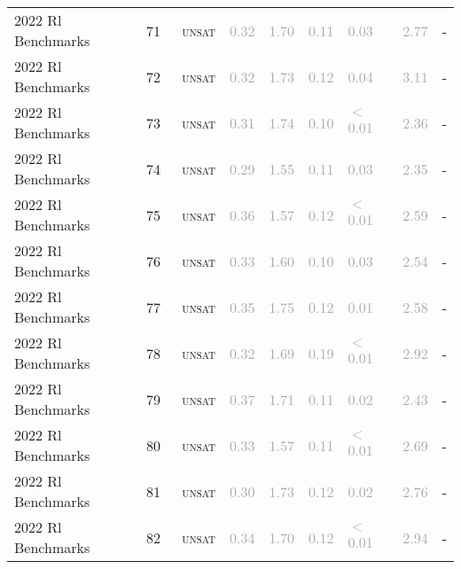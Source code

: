 \begin{center}
{\begin{longtable}{@{}lllllllll@{}}
2022 Rl Benchmarks & 71 & ~\textsc{unsat} & \textcolor{darkgray}{0.32} & \textcolor{darkgray}{1.70} & \textcolor{darkgray}{0.11} & \textcolor{darkgray}{0.03} & \textcolor{darkgray}{2.77} & - \\
2022 Rl Benchmarks & 72 & ~\textsc{unsat} & \textcolor{darkgray}{0.32} & \textcolor{darkgray}{1.73} & \textcolor{darkgray}{0.12} & \textcolor{darkgray}{0.04} & \textcolor{darkgray}{3.11} & - \\
2022 Rl Benchmarks & 73 & ~\textsc{unsat} & \textcolor{darkgray}{0.31} & \textcolor{darkgray}{1.74} & \textcolor{darkgray}{0.10} & \textcolor{darkgray}{$<$0.01} & \textcolor{darkgray}{2.36} & - \\
2022 Rl Benchmarks & 74 & ~\textsc{unsat} & \textcolor{darkgray}{0.29} & \textcolor{darkgray}{1.55} & \textcolor{darkgray}{0.11} & \textcolor{darkgray}{0.03} & \textcolor{darkgray}{2.35} & - \\
2022 Rl Benchmarks & 75 & ~\textsc{unsat} & \textcolor{darkgray}{0.36} & \textcolor{darkgray}{1.57} & \textcolor{darkgray}{0.12} & \textcolor{darkgray}{$<$0.01} & \textcolor{darkgray}{2.59} & - \\
2022 Rl Benchmarks & 76 & ~\textsc{unsat} & \textcolor{darkgray}{0.33} & \textcolor{darkgray}{1.60} & \textcolor{darkgray}{0.10} & \textcolor{darkgray}{0.03} & \textcolor{darkgray}{2.54} & - \\
2022 Rl Benchmarks & 77 & ~\textsc{unsat} & \textcolor{darkgray}{0.35} & \textcolor{darkgray}{1.75} & \textcolor{darkgray}{0.12} & \textcolor{darkgray}{0.01} & \textcolor{darkgray}{2.58} & - \\
2022 Rl Benchmarks & 78 & ~\textsc{unsat} & \textcolor{darkgray}{0.32} & \textcolor{darkgray}{1.69} & \textcolor{darkgray}{0.19} & \textcolor{darkgray}{$<$0.01} & \textcolor{darkgray}{2.92} & - \\
2022 Rl Benchmarks & 79 & ~\textsc{unsat} & \textcolor{darkgray}{0.37} & \textcolor{darkgray}{1.71} & \textcolor{darkgray}{0.11} & \textcolor{darkgray}{0.02} & \textcolor{darkgray}{2.43} & - \\
2022 Rl Benchmarks & 80 & ~\textsc{unsat} & \textcolor{darkgray}{0.33} & \textcolor{darkgray}{1.57} & \textcolor{darkgray}{0.11} & \textcolor{darkgray}{$<$0.01} & \textcolor{darkgray}{2.69} & - \\
2022 Rl Benchmarks & 81 & ~\textsc{unsat} & \textcolor{darkgray}{0.30} & \textcolor{darkgray}{1.73} & \textcolor{darkgray}{0.12} & \textcolor{darkgray}{0.02} & \textcolor{darkgray}{2.76} & - \\
2022 Rl Benchmarks & 82 & ~\textsc{unsat} & \textcolor{darkgray}{0.34} & \textcolor{darkgray}{1.70} & \textcolor{darkgray}{0.12} & \textcolor{darkgray}{$<$0.01} & \textcolor{darkgray}{2.94} & - \\

\end{longtable}}
\end{center}

